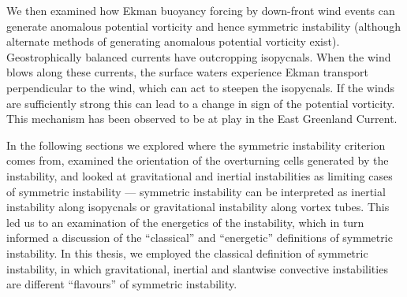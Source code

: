 We then examined how Ekman buoyancy forcing by down-front wind events can generate anomalous potential vorticity and hence symmetric instability (although alternate methods of generating anomalous potential vorticity exist). Geostrophically balanced currents have outcropping isopycnals. When the wind blows along these currents, the surface waters experience Ekman transport perpendicular to the wind, which can act to steepen the isopycnals. If the winds are sufficiently strong this can lead to a change in sign of the potential vorticity. This mechanism has been observed to be at play in the East Greenland Current.

In the following sections we explored where the symmetric instability criterion comes from, examined the orientation of the overturning cells generated by the instability, and looked at gravitational and inertial instabilities as limiting cases of symmetric instability --- symmetric instability can be interpreted as inertial instability along isopycnals or gravitational instability along vortex tubes. This led us to an examination of the energetics of the instability, which in turn informed a discussion of the ``classical'' and ``energetic'' definitions of symmetric instability. In this thesis, we employed the classical definition of symmetric instability, in which gravitational, inertial and slantwise convective instabilities are different ``flavours'' of symmetric instability.

